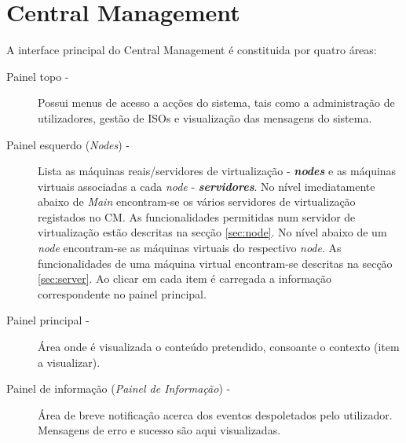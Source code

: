 
\chapter{\textsf{Central Management}}

A interface principal do Central Management é constituida por quatro áreas:

\begin{description}
	\item[Painel topo -] Possui menus de acesso a acções do sistema, tais como a administração de utilizadores, gestão de ISOs e visualização das mensagens do sistema.
	\item[Painel esquerdo (\emph{Nodes}) -] Lista as máquinas reais/servidores de virtualização - {\bf\emph{nodes}} e as máquinas virtuais associadas a cada \emph{node} - {\bf\emph{servidores}}. No nível imediatamente abaixo de \emph{Main} encontram-se os vários servidores de virtualização registados no CM. As funcionalidades permitidas num servidor de virtualização estão descritas na secção \ref{sec:node}. No nível abaixo de um \emph{node} encontram-se as máquinas virtuais do respectivo \emph{node}. As funcionalidades de uma máquina virtual encontram-se descritas na secção \ref{sec:server}. Ao clicar em cada item é carregada a informação correspondente no painel principal.
	\item[Painel principal -] Área onde é visualizada o conteúdo pretendido, consoante o contexto (item a visualizar).
	\item[Painel de informação (\emph{Painel de Informação}) -] Área de breve notificação acerca dos eventos despoletados pelo utilizador. Mensagens de erro e sucesso são aqui visualizadas.
\end{description}

